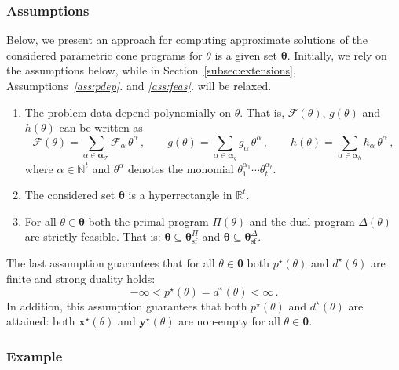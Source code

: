 \documentclass{article}
\newcommand{\N}{\mathbb{N}}         %
\newcommand{\R}{\mathbb{R}}         %
\newcommand{\opt}{\star}                    %
\newcommand{\strfeas}{\mathrm{sf}}          %
\newcommand{\ppar}{\theta}                          %
\newcommand{\Ppar}{{\bm{\theta}}}                   %
\newcommand{\calF}{\mathcal{F}}                     %
\newcommand{\Pstrfeas}{\Ppar^\Pi_\strfeas}          %
\newcommand{\Dstrfeas}{\Ppar^\Delta_\strfeas}       %
\newcommand{\Alpha}{\bm{\alpha}}    %
\begin{document}
\subsubsection{Assumptions}

Below, we present an approach for computing approximate solutions of the considered parametric cone programs for $\ppar$ is a given set $\Ppar$. Initially, we rely on the assumptions below, while in Section~\ref{subsec:extensions}, Assumptions~{\it{}\ref{ass:pdep}.} and {\it{}\ref{ass:feas}.} will be relaxed.
\begin{enumerate}[\it\text{A}1.]
\item\label{ass:pdep} The problem data depend polynomially on $\ppar$. That is, $\calF(\ppar)$, $g(\ppar)$ and $h(\ppar)$ can be written as
    \begin{equation}\label{eq:pdep}
       \calF(\ppar) = \sum_{\alpha\in\Alpha_\calF} \calF_\alpha \, \ppar^\alpha \,,\qquad%
       g(\ppar)     = \sum_{\alpha\in\Alpha_g}         g_\alpha \, \ppar^\alpha \,,\qquad%
       h(\ppar)     = \sum_{\alpha\in\Alpha_h}         h_\alpha \, \ppar^\alpha \,,%
    \end{equation}
    where $\alpha\in\N^t$ and $\ppar^\alpha$ denotes the monomial $\ppar_1^{\alpha_1} \cdots \ppar_t^{\alpha_t}$.
\item\label{ass:Ppar} The considered set $\Ppar$ is a hyperrectangle in $\R^t$.
\item\label{ass:feas} For all $\ppar\in\Ppar$ both the primal program $\Pi(\ppar)$ and the dual program $\Delta(\ppar)$ are strictly feasible. That is: $\Ppar\subseteq\Pstrfeas$ and $\Ppar\subseteq\Dstrfeas$.
\end{enumerate}
The last assumption guarantees that for all $\ppar\in\Ppar$ both $p^\opt(\ppar)$ and $d^\opt(\ppar)$ are finite and strong duality holds:
\[ -\infty < p^\opt(\ppar) = d^\opt(\ppar) < \infty \,.%
\]
In addition, this assumption guarantees that both $p^\opt(\ppar)$ and $d^\opt(\ppar)$ are attained: both $\bm{x}^\opt(\ppar)$ and $\bm{y}^\opt(\ppar)$ are non-empty for all $\ppar\in\Ppar$.


\subsubsection{Example}
\end{document}
